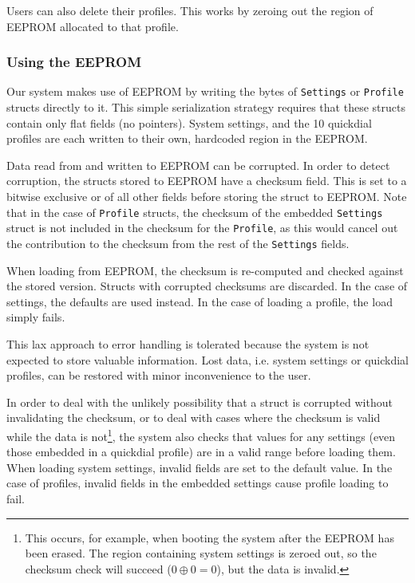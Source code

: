 \documentclass[11pt,a4paper,twocolumn]{scrartcl}
\begin{document}
Users can also delete their profiles. This works by zeroing out the region of EEPROM allocated to that profile.

\subsubsection{Using the EEPROM}

Our system makes use of EEPROM by writing the bytes of \verb!Settings! or \verb!Profile! structs directly to it. This simple serialization strategy requires that these structs contain only flat fields (no pointers). System settings, and the 10 quickdial profiles are each written to their own, hardcoded region in the EEPROM.

Data read from and written to EEPROM can be corrupted. In order to detect corruption, the structs stored to EEPROM have a checksum field. This is set to a bitwise exclusive or of all other fields before storing the struct to EEPROM. Note that in the case of \verb!Profile! structs, the checksum of the embedded \verb!Settings! struct is not included in the checksum for the \verb!Profile!, as this would cancel out the contribution to the checksum from the rest of the \verb!Settings! fields.

When loading from EEPROM, the checksum is re-computed and checked against the stored version. Structs with corrupted checksums are discarded. In the case of settings, the defaults are used instead. In the case of loading a profile, the load simply fails.

This lax approach to error handling is tolerated because the system is not expected to store valuable information. Lost data, i.e. system settings or quickdial profiles, can be restored with minor inconvenience to the user.

In order to deal with the unlikely possibility that a struct is corrupted without invalidating the checksum, or to deal with cases where the checksum is valid while the data is not\footnote{This occurs, for example, when booting the system after the EEPROM has been erased. The region containing system settings is zeroed out, so the checksum check will succeed ($0 \oplus 0 = 0$), but the data is invalid.}, the system also checks that values for any settings (even those embedded in a quickdial profile) are in a valid range before loading them. When loading system settings, invalid fields are set to the default value. In the case of profiles, invalid fields in the embedded settings cause profile loading to fail.
\end{document}
